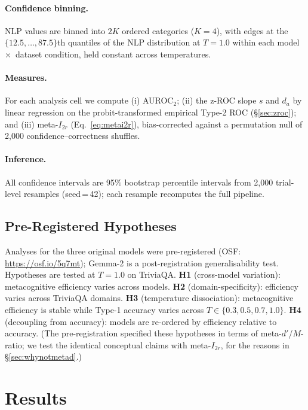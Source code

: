 \documentclass{article}
\begin{document}
\paragraph{Confidence binning.} NLP values are binned into $2K$ ordered categories ($K=4$), with edges at the $\{12.5,\ldots,87.5\}$th quantiles of the NLP distribution at $T=1.0$ within each model~$\times$~dataset condition, held constant across temperatures.

\paragraph{Measures.} For each analysis cell we compute (i) AUROC$_2$; (ii) the z-ROC slope $s$ and $d_a$ by linear regression on the probit-transformed empirical Type-2 ROC (\S\ref{sec:zroc}); and (iii) meta-$I_{2r}$ (Eq.~\ref{eq:metai2r}), bias-corrected against a permutation null of 2{,}000 confidence--correctness shuffles.

\paragraph{Inference.} All confidence intervals are 95\% bootstrap percentile intervals from 2{,}000 trial-level resamples (seed\,=\,42); each resample recomputes the full pipeline.

\subsection{Pre-Registered Hypotheses}

Analyses for the three original models were pre-registered (OSF: \url{https://osf.io/5q7mt}); Gemma-2 is a post-registration generalisability test. Hypotheses are tested at $T=1.0$ on TriviaQA. \textbf{H1} (cross-model variation): metacognitive efficiency varies across models. \textbf{H2} (domain-specificity): efficiency varies across TriviaQA domains. \textbf{H3} (temperature dissociation): metacognitive efficiency is stable while Type-1 accuracy varies across $T \in \{0.3,0.5,0.7,1.0\}$. \textbf{H4} (decoupling from accuracy): models are re-ordered by efficiency relative to accuracy. (The pre-registration specified these hypotheses in terms of meta-$d'$/$M$-ratio; we test the identical conceptual claims with meta-$I_{2r}$, for the reasons in \S\ref{sec:whynotmetad}.)

\section{Results}
\label{sec:results}
\end{document}
